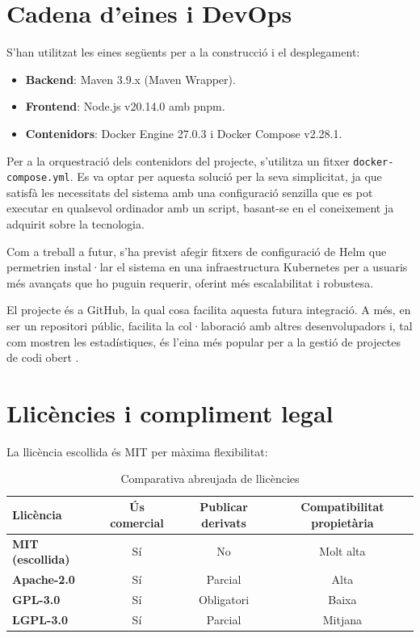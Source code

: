 \section{Cadena d'eines i DevOps}
S'han utilitzat les eines següents per a la construcció i el desplegament:

\begin{itemize}
\item \textbf{Backend}: Maven 3.9.x (Maven Wrapper).
\item \textbf{Frontend}: Node.js v20.14.0 amb pnpm.
\item \textbf{Contenidors}: Docker Engine 27.0.3 i Docker Compose v2.28.1.
\end{itemize}

Per a la orquestració dels contenidors del projecte, s'utilitza un fitxer \texttt{docker-compose.yml}. Es va optar per aquesta solució per la seva simplicitat, ja que satisfà les necessitats del sistema amb una configuració senzilla que es pot executar en qualsevol ordinador amb un script, basant-se en el coneixement ja adquirit sobre la tecnologia.

Com a treball a futur, s'ha previst afegir fitxers de configuració de Helm que permetrien instal·lar el sistema en una infraestructura Kubernetes per a usuaris més avançats que ho puguin requerir, oferint més escalabilitat i robustesa. 

El projecte és a GitHub, la qual cosa facilita aquesta futura integració. A més, en ser un repositori públic, facilita la col·laboració amb altres desenvolupadors i, tal com mostren les estadístiques, és l'eina més popular per a la gestió de projectes de codi obert \cite{kinsta_github_stats}.

\section{Llicències i compliment legal}
La llicència escollida és MIT per màxima flexibilitat:

\begin{table}[h]
\centering
\begin{tabular}{|l|c|c|c|}
\hline
\textbf{Llicència} & \textbf{Ús comercial} & \textbf{Publicar derivats} & \textbf{Compatibilitat propietària} \\
\hline
\textbf{MIT (escollida)} & Sí & No & Molt alta \\
\hline
\textbf{Apache-2.0} & Sí & Parcial & Alta \\
\hline
\textbf{GPL-3.0} & Sí & Obligatori & Baixa \\
\hline
\textbf{LGPL-3.0} & Sí & Parcial & Mitjana \\
\hline
\end{tabular}
\caption{Comparativa abreujada de llicències}
\end{table}

